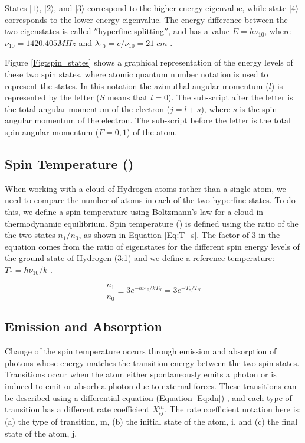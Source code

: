 States $| 1 \rangle$, $| 2 \rangle$, and $| 3 \rangle$ correspond to the higher energy eigenvalue, while state $| 4 \rangle$ corresponds to the lower energy eigenvalue. The energy difference between the two eigenstates is called $''$hyperfine splitting$''$, and has a value $E = h \nu_{10}$, where $\nu_{10}=1420.405 MHz$ and $\lambda_{10} = c /\nu_{10} = 21 \; cm$ \cite{townsend2000}. 

Figure \ref{Fig:spin_states} shows a graphical representation of the energy levels of these two spin states, where atomic quantum number notation is used to represent the states. In this notation the azimuthal angular momentum ($l$) is represented by the letter ($S$ means that $l=0$). The sub-script after the letter is the total angular momentum of the electron ($j=l+s$), where $s$ is the spin angular momentum of the electron. The sub-script before the letter is the total spin angular momentum ($F=0,1$) of the atom. 


\subsection{Spin Temperature (\ts)}

When working with a cloud of Hydrogen atoms rather than a single atom, we need to compare the number of atoms in each of the two hyperfine states. To do this, we define a spin temperature using Boltzmann's law for a cloud in thermodynamic equilibrium. Spin temperature (\ts) is defined using the ratio of the the two states $n_1/n_0$, as shown in Equation \ref{Eq:T_s}. The factor of 3 in the equation comes from the ratio of eigenstates for the different spin energy levels of the ground state of Hydrogen (3:1) and we define a reference temperature: $T_* = h \nu_{10}/k$ \cite{field_1958}. 

\begin{equation}\label{Eq:T_s}
\frac{n_1}{n_0} \equiv 3 e^{- h \nu_{10} / kT_S} = 3 e^{-T_*/T_S}
\end{equation} 


\subsection{Emission and Absorption} \label{Sec:dT_S}

Change of the spin temperature occurs through emission and absorption of photons whose energy matches the transition energy between the two spin states. Transitions occur when the atom either spontaneously emits a photon or is induced to emit or absorb a photon due to external forces. These transitions can be described using a differential equation (Equation \ref{Eq:dn}) \cite{furlanetto_2006}, and each type of transition has a different rate coefficient $X^m_{ij}$. The rate coefficient notation here is: (a) the type of transition, m, (b) the initial state of the atom, i, and (c) the final state of the atom, j. 

